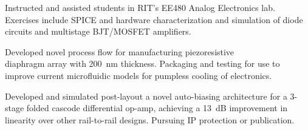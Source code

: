 \documentclass{cv}  %
\begin{document}
\begin{paracol}{2}
\normalsize\rm Instructed and assisted students in RIT's EE480 Analog Electronics lab. Exercises include SPICE and hardware characterization and simulation of diode circuits and multistage BJT/MOSFET amplifiers.

\hspace{0pt}
\vspace{-20pt}

\divider

\large{} \hfill \small{} \par\smallskip
\vspace{-8pt}
\small{} \hfill \small{}

\normalsize\rm Developed novel process flow for manufacturing piezoresistive \\diaphragm array with \qty{200}{\nm} thickness. Packaging and testing for use to improve current microfluidic models for pumpless cooling of electronics.





\parbox[t]{0.25 \textwidth}{\large{}}
\hfill
\parbox[t]{0.6 \linewidth}{\vspace{-11pt} Developed and simulated post-layout a novel auto-biasing architecture for a 3-stage folded cascode differential op-amp, achieving a \qty{13}{\dB} improvement in linearity over other rail-to-rail designs. Pursuing IP protection or publication.}
\hspace{0pt}
\vspace{-6pt}


\end{paracol}
\end{document}
